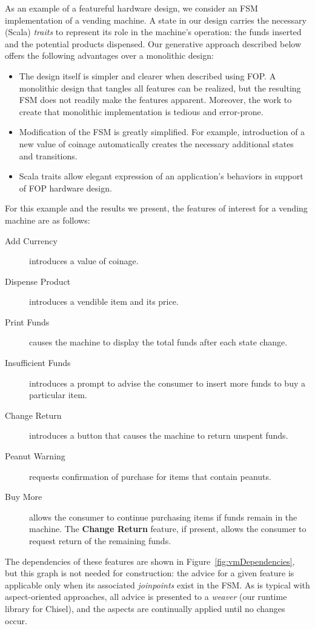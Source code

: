 \documentclass[sigplan,anonymous, review]{acmart}
\begin{document}
As an example of a featureful hardware design, we consider an FSM implementation of a vending machine.   A state in our design carries the necessary (Scala) \emph{traits} to represent its role in the machine's operation:  the funds inserted and the potential products dispensed.  Our generative approach described below offers the following advantages over a monolithic design:
\begin{itemize}
    \item The design itself is simpler and clearer when described using FOP.  A monolithic design that tangles all features can be realized, but the resulting FSM does not readily make the features apparent.  Moreover, the work to create that monolithic implementation is tedious and error-prone.
    \item Modification of the FSM is greatly simplified.  For example, introduction of a new value of coinage automatically creates the necessary additional states and transitions.
    \item Scala traits allow elegant expression of an application's behaviors in support of FOP hardware design.
\end{itemize}
For this example and the results we present, the features of interest for a vending machine are as follows:
\begin{description}
    \item[Add Currency] introduces a value of coinage.
    \item[Dispense Product] introduces a vendible item and its price.
    \item[Print Funds] causes the machine to display the total funds after each state change.
    \item[Insufficient Funds] introduces a prompt to advise the consumer to insert more funds to buy a particular item.
    \item[Change Return] introduces a button that causes the machine to return unspent funds.
    \item[Peanut Warning] requests confirmation of purchase for items that contain peanuts.
    \item[Buy More] allows the consumer to continue purchasing items if funds remain in the machine.  The \textbf{Change Return} feature, if present, allows the consumer to request return of the remaining funds.
\end{description}
The dependencies of these features are shown in Figure~\ref{fig:vmDependencies}, but this graph is not needed for construction:  the advice for a given feature is applicable only when its associated \emph{joinpoints} exist in the FSM.  As is typical with aspect-oriented approaches, all advice is presented to a \emph{weaver} (our runtime library for Chisel), and the aspects are continually applied until no changes occur.
\end{document}
